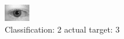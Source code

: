 \begin{figure}[h!]
\begin{center}
\includegraphics[width=0.60\columnwidth]{figures/ID620_class_2_target_3.png}
\end{center}
\caption{ Classification: 2 actual target: 3}
\label{fig:ID620_class_2_target_3}
\end{figure}
